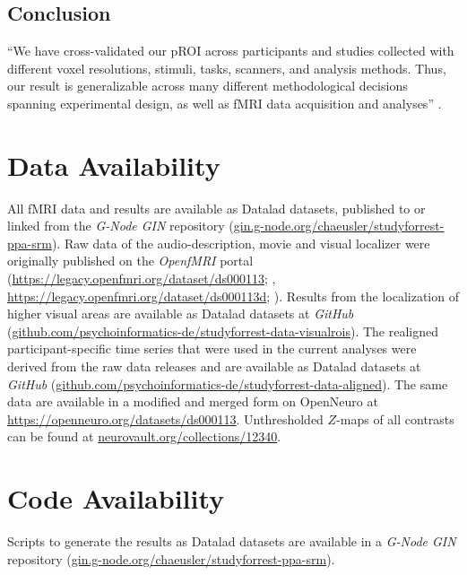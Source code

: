 \subsection{Conclusion}

``We have cross-validated our pROI across participants and studies collected
with different voxel resolutions, stimuli, tasks, scanners, and analysis
methods.
%
Thus, our result is generalizable across many different methodological decisions
spanning experimental design, as well as fMRI data acquisition and analyses''
\citep{weiner2018defining}.


\section{Data Availability}



All fMRI data and results are available as Datalad \citep{halchenko2021datalad}
datasets, published to or linked from the \emph{G-Node GIN} repository
(\href{https://gin.g-node.org/chaeusler/studyforrest-ppa-srm}{\url{gin.g-node.org/chaeusler/studyforrest-ppa-srm}}).
Raw data of the audio-description, movie and visual localizer were originally
published on the \emph{OpenfMRI} portal
(\url{https://legacy.openfmri.org/dataset/ds000113}; \citep{Hanke2014ds000113},
\space \url{https://legacy.openfmri.org/dataset/ds000113d};
\citep{hanke2016ds000113d}).
Results from the localization of higher visual areas are available as Datalad
datasets at \emph{GitHub}
(\href{https://github.com/psychoinformatics-de/studyforrest-data-visualrois}{\url{github.com/psychoinformatics-de/studyforrest-data-visualrois}}).
The realigned participant-specific time series that were used in the current
analyses were derived from the raw data releases and are available as Datalad
datasets at \emph{GitHub}
(\href{https://github.com/psychoinformatics-de/studyforrest-data-aligned}{\url{github.com/psychoinformatics-de/studyforrest-data-aligned}}).
The same data are available in a modified and merged form on OpenNeuro at
\url{https://openneuro.org/datasets/ds000113}.
Unthresholded $Z$-maps of all contrasts can be found at
\href{https://identifiers.org/neurovault.collection:12340}{\url{neurovault.org/collections/12340}}.


\section*{Code Availability}

Scripts to generate the results as Datalad \citep{halchenko2021datalad} datasets
are available in a \emph{G-Node GIN} repository
(\href{https://gin.g-node.org/chaeusler/studyforrest-ppa-srm}{\url{gin.g-node.org/chaeusler/studyforrest-ppa-srm}}).

